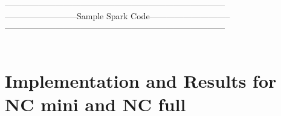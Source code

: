\documentclass[11pt]{scrartcl} %
\begin{document}
\begin{enumerate}[A)]
\begin{enumerate}
\\
\\
------------------------------------------------------------------------------\\
--------------------------Sample Spark Code-----------------------------\\
------------------------------------------------------------------------------\\
\\


\end{enumerate}
\end{enumerate}


\section{Implementation and Results for NC mini and NC full}
\end{document}

